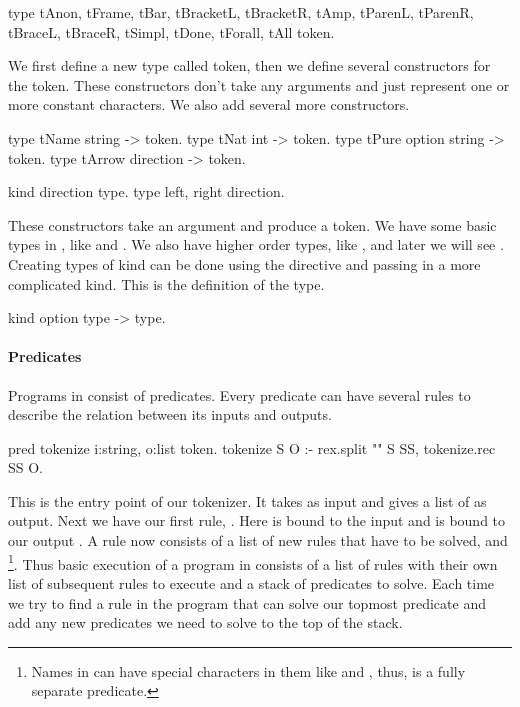 \documentclass[thesis.tex]{subfiles}
\begin{document}
{{\begin{elpicode}
  type tAnon, tFrame, tBar, tBracketL, tBracketR, tAmp,
       tParenL, tParenR, tBraceL, tBraceR, tSimpl,
       tDone, tForall, tAll token.
\end{elpicode}
We first define a new type called token, then we define several constructors for the token. These constructors don't take any arguments and just represent one or more constant characters. We also add several more constructors.
\begin{elpicode}
  type tName string -> token.
  type tNat int -> token.
  type tPure option string -> token.
  type tArrow direction -> token.

  kind direction type.
  type left, right direction.
\end{elpicode}
These constructors take an argument and produce a token. We have some basic types in \elpi, like  and . We also have higher order types, like , and later we will see .
Creating types of kind  can be done using the  directive and passing in a more complicated kind. This is the definition of the  type.
\begin{elpicode}
  kind option type -> type.
\end{elpicode}

\paragraph*{Predicates}
Programs in \elpi consist of predicates. Every predicate can have several rules to describe the relation between its inputs and outputs.
\begin{elpicode}
  pred tokenize i:string, o:list token.
  tokenize S O :- 
    rex.split "" S SS,
    tokenize.rec SS O.
\end{elpicode}
This is the entry point of our tokenizer. It takes  as input and gives a list of  as output. Next we have our first rule, . Here  is bound to the input  and  is bound to our output . A rule now consists of a list of new rules that have to be solved,  and \footnote{Names in \elpi can have special characters in them like  and \elpiinline{-}, thus,  is a fully separate predicate.}. Thus basic execution of a program in \elpi consists of a list of rules with their own list of subsequent rules to execute and a stack of predicates to solve. Each time we try to find a rule in the program that can solve our topmost predicate and add any new predicates we need to solve to the top of the stack.

}}
\end{document}
